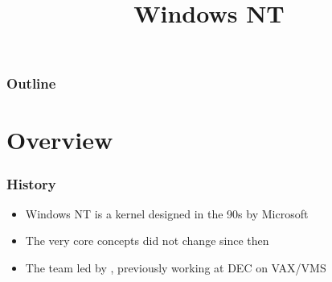 %
%
%
%
%
%

%
%

%
%

\def\path{../../..}

%
%



%
%

\title{Windows NT}

%
%



%
%

\begin{frame}
  \titlepage
\end{frame}

%
%

\begin{frame}
  \frametitle{Outline}

  \tableofcontents
\end{frame}

%
%

\section{Overview}


\begin{frame}
  \frametitle{History}

  \begin{itemize}
    \item
      Windows NT is a kernel designed in the 90s by Microsoft
    \item
      The very core concepts did not change since then
    \item
      The team led by , previously working at DEC on VAX/VMS
  \end{itemize}

\end{frame}


